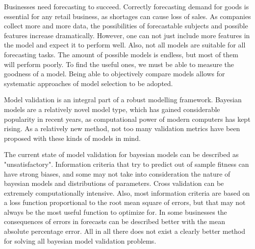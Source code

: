 \documentclass[english, 12pt, a4paper, sci, utf8, a-1b, online]{aaltothesis}
\begin{document}







Businesses need forecasting to succeed. Correctly forecasting demand for goods is essential for any retail business, 
as shortages can cause loss of sales. As companies collect more and more data, 
the possibilities of forecastable subjects and possible features increase dramatically. However, one can not just
include more features in the model and expect it to perform well. Also, not all models are suitable for all 
forecasting tasks. The amount of possible models is endless, but most of them will perform poorly. To find the useful ones,
we must be able to measure the goodness of a model. Being able to objectively compare models allows for systematic 
approaches of model selection to be adopted.

Model validation is an integral part of a robust modelling framework. Bayesian models are a relatively novel
model type, which has gained considerable popularity in recent years, as computational power of modern computers 
has kept rising. As a relatively new method, not too many validation metrics have been proposed with these kinds
of models in mind.

The current state of model validation for bayesian models can be described as "unsatisfactory". Information
criteria that try to predict out of sample fitness can have strong biases, and some may not take into consideration
the nature of bayesian models and distributions of parameters. Cross validation can be extremely computationally 
intensive. Also, most information criteria are based on a loss function proportional to the root mean square of errors,
but that may not always be the most useful function to optimize for. In some businesses the consequences of errors
in forecasts can be described better with the mean absolute percentage error. All in all there does not
exist a clearly better method for solving all bayesian model validation problems.
\end{document}
